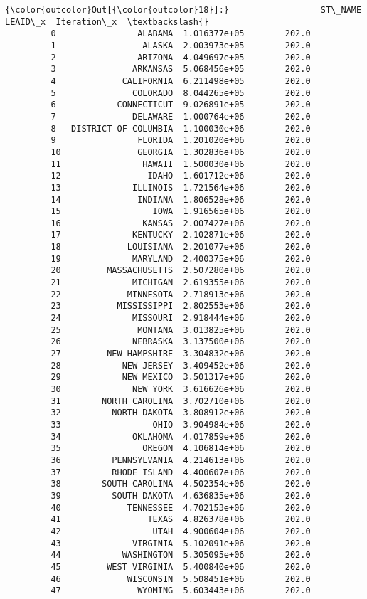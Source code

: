 \documentclass[11pt]{article}
\begin{document}
\begin{Verbatim}[commandchars=\\\{\}]
{\color{outcolor}Out[{\color{outcolor}18}]:}                  ST\_NAME       LEAID\_x  Iteration\_x  \textbackslash{}
         0                ALABAMA  1.016377e+05        202.0   
         1                 ALASKA  2.003973e+05        202.0   
         2                ARIZONA  4.049697e+05        202.0   
         3               ARKANSAS  5.068456e+05        202.0   
         4             CALIFORNIA  6.211498e+05        202.0   
         5               COLORADO  8.044265e+05        202.0   
         6            CONNECTICUT  9.026891e+05        202.0   
         7               DELAWARE  1.000764e+06        202.0   
         8   DISTRICT OF COLUMBIA  1.100030e+06        202.0   
         9                FLORIDA  1.201020e+06        202.0   
         10               GEORGIA  1.302836e+06        202.0   
         11                HAWAII  1.500030e+06        202.0   
         12                 IDAHO  1.601712e+06        202.0   
         13              ILLINOIS  1.721564e+06        202.0   
         14               INDIANA  1.806528e+06        202.0   
         15                  IOWA  1.916565e+06        202.0   
         16                KANSAS  2.007427e+06        202.0   
         17              KENTUCKY  2.102871e+06        202.0   
         18             LOUISIANA  2.201077e+06        202.0   
         19              MARYLAND  2.400375e+06        202.0   
         20         MASSACHUSETTS  2.507280e+06        202.0   
         21              MICHIGAN  2.619355e+06        202.0   
         22             MINNESOTA  2.718913e+06        202.0   
         23           MISSISSIPPI  2.802553e+06        202.0   
         24              MISSOURI  2.918444e+06        202.0   
         25               MONTANA  3.013825e+06        202.0   
         26              NEBRASKA  3.137500e+06        202.0   
         27         NEW HAMPSHIRE  3.304832e+06        202.0   
         28            NEW JERSEY  3.409452e+06        202.0   
         29            NEW MEXICO  3.501317e+06        202.0   
         30              NEW YORK  3.616626e+06        202.0   
         31        NORTH CAROLINA  3.702710e+06        202.0   
         32          NORTH DAKOTA  3.808912e+06        202.0   
         33                  OHIO  3.904984e+06        202.0   
         34              OKLAHOMA  4.017859e+06        202.0   
         35                OREGON  4.106814e+06        202.0   
         36          PENNSYLVANIA  4.214613e+06        202.0   
         37          RHODE ISLAND  4.400607e+06        202.0   
         38        SOUTH CAROLINA  4.502354e+06        202.0   
         39          SOUTH DAKOTA  4.636835e+06        202.0   
         40             TENNESSEE  4.702153e+06        202.0   
         41                 TEXAS  4.826378e+06        202.0   
         42                  UTAH  4.900604e+06        202.0   
         43              VIRGINIA  5.102091e+06        202.0   
         44            WASHINGTON  5.305095e+06        202.0   
         45         WEST VIRGINIA  5.400840e+06        202.0   
         46             WISCONSIN  5.508451e+06        202.0   
         47               WYOMING  5.603443e+06        202.0   
         

\end{Verbatim}
\end{document}
